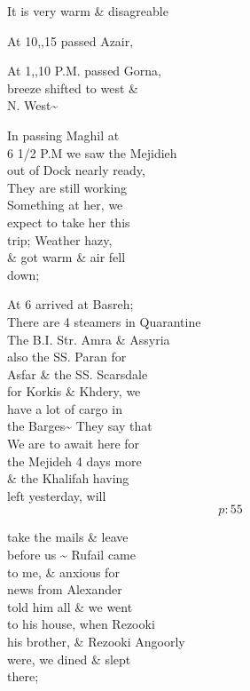 \documentclass{report}
\begin{document}
	\par{
 	It is very warm \& disagreable\ \\
	}

	\par{
 	At 10,,15 passed Azair,\ \\
	}

	\par{
 	At 1,,10 P.M. passed Gorna,\ \\breeze shifted to west \&\ \\N. West\~{}\ \\
	}

	\par{
 	In passing Maghil at\ \\6 1/2 P.M we saw the Mejidieh\ \\out of Dock nearly ready,\ \\They are still working\ \\Something at her, we\ \\expect to take her this\ \\trip; Weather hazy,\ \\\& got warm \& air fell\ \\down;\ \\
	}

	\par{
 	At 6 arrived at Basreh;\ \\There are 4 steamers in Quarantine\ \\The B.I. Str. Amra \& Assyria\ \\also the SS. Paran for\ \\Asfar \& the SS. Scarsdale\ \\for Korkis \& Khdery, we\ \\have a lot of cargo in\ \\the Barges\~{} They say that\ \\We are to await here for\ \\the Mejideh 4 days more\ \\\& the Khalifah having\ \\left yesterday, will\ \\
  \[p: 55 \]

	}






	\par{
 	take the mails \& leave\ \\before us \~{} Rufail came\ \\to me, \& anxious for\ \\news from Alexander\ \\told him all \& we went\ \\to his house, when Rezooki\ \\his brother, \& Rezooki Angoorly\ \\were, we dined \& slept\ \\there;\ \\
	}
\end{document}

